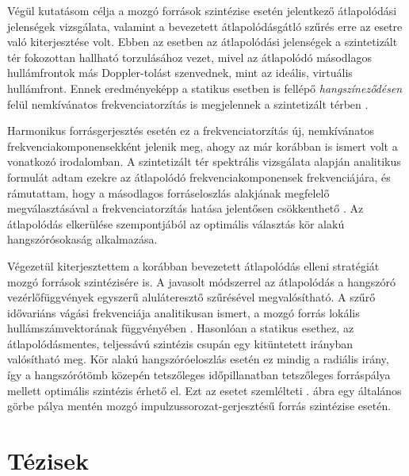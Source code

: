 \documentclass[10pt,twoside]{article}
\theoremstyle{thesisgroupstyle}
\theoremstyle{indented}
\begin{document}
Végül kutatásom célja a mozgó források szintézise esetén jelentkező átlapolódási jelenségek vizsgálata, valamint a bevezetett átlapolódásgátló szűrés erre az esetre való kiterjesztése volt.
Ebben az esetben az átlapolódási jelenségek a szintetizált tér fokozottan hallható torzulásához vezet, mivel az átlapolódó másodlagos hullámfrontok más Doppler-tolást szenvednek, mint az ideális, virtuális hullámfront.
Ennek eredményeképp a statikus esetben is fellépő \emph{hangszíneződésen} felül nemkívánatos frekvenciatorzítás is megjelennek a szintetizált térben \cite{firtha2016:daga_booklet}.

Harmonikus forrásgerjesztés esetén ez a frekvenciatorzítás új, nemkívánatos frekvenciakomponensekként jelenik meg, ahogy az már korábban is ismert volt a vonatkozó irodalomban.
A szintetizált tér spektrális vizsgálata alapján analitikus formulát adtam ezekre az átlapolódó frekvenciakomponensek frekvenciájára, és rámutattam, hogy a másodlagos forráseloszlás alakjának megfelelő megválasztásával a frekvenciatorzítás hatása jelentősen csökkenthető \cite{firtha2016:daga_booklet}.
Az átlapolódás elkerülése szempontjából az optimális választás kör alakú hangszórósokaság alkalmazása.

Végezetül kiterjesztettem a korábban bevezetett átlapolódás elleni stratégiát mozgó források szintézisére is.
A javasolt módszerrel az átlapolódás a hangszóró vezérlőfüggvények egyszerű aluláteresztő szűrésével megvalósítható.
A szűrő idővariáns vágási frekvenciája analitikusan ismert, a mozgó forrás lokális hullámszámvektorának függvényében \cite{Firtha2018_daga_moving_source_booklet}.
Hasonlóan a statikus esethez, az átlapolódásmentes, teljessávú szintézis csupán egy kitüntetett irányban valósítható meg.
Kör alakú hangszóróeloszlás esetén ez mindig a radiális irány, így a hangszórótömb közepén tetszőleges időpillanatban tetszőleges forráspálya mellett optimális szintézis érhető el.
Ezt az esetet szemlélteti . ábra egy általános görbe pálya mentén mozgó impulzussorozat-gerjesztésű forrás szintézise esetén.

\clearpage	
\section{Tézisek}
\label{sec:theses}
\end{document}
